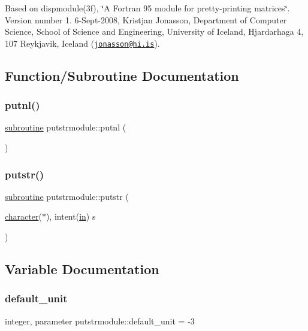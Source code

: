 Based on dispmodule(3f), \char`\"{}\+A Fortran 95 module for pretty-\/printing matrices\char`\"{}. Version number 1. 6-\/\+Sept-\/2008, Kristjan Jonasson, Department of Computer Science, School of Science and Engineering, University of Iceland, Hjardarhaga 4, 107 Reykjavik, Iceland (\href{mailto:jonasson@hi.is}{\tt jonasson@hi.\+is}). 

\subsection{Function/\+Subroutine Documentation}
\mbox{\label{namespaceputstrmodule_ab85a50db8f38a797bd4ecf0b00a40e85}} 
\subsubsection{\texorpdfstring{putnl()}{putnl()}}
{\footnotesize\ttfamily \hyperlink{M__stopwatch_83_8txt_acfbcff50169d691ff02d4a123ed70482}{subroutine} putstrmodule\+::putnl (\begin{DoxyParamCaption}{ }\end{DoxyParamCaption})}

\mbox{\label{namespaceputstrmodule_a3557206c6eaead47ecd6a04e58f69f90}} 
\subsubsection{\texorpdfstring{putstr()}{putstr()}}
{\footnotesize\ttfamily \hyperlink{M__stopwatch_83_8txt_acfbcff50169d691ff02d4a123ed70482}{subroutine} putstrmodule\+::putstr (\begin{DoxyParamCaption}\item[{\hyperlink{option__stopwatch_83_8txt_abd4b21fbbd175834027b5224bfe97e66}{character}($\ast$), intent(\hyperlink{M__journal_83_8txt_afce72651d1eed785a2132bee863b2f38}{in})}]{s }\end{DoxyParamCaption})}



\subsection{Variable Documentation}
\mbox{\label{namespaceputstrmodule_a7ec14945bb8449f20f21c0545b1825ee}} 
\subsubsection{\texorpdfstring{default\+\_\+unit}{default\_unit}}
{\footnotesize\ttfamily integer, parameter putstrmodule\+::default\+\_\+unit = -\/3}

